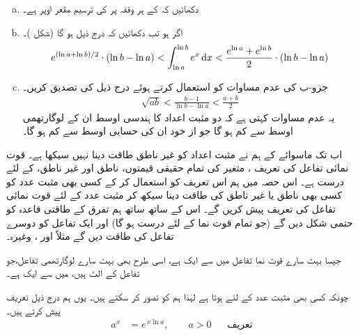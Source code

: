 \begin{enumerate}[a.]
\item
دکھائیں کہ  کے ہر وقفہ پر  کی ترسیم مقعر اوپر ہے۔
\item
اگر  ہو تب دکھائیں کہ درج ذیل ہو گا (شکل )۔
\begin{align*}
e^{(\ln a+\ln b)/2}\cdot(\ln b-\ln a)<\int_{\ln a}^{\ln b} e^x\dif x<\frac{e^{\ln a}+e^{\ln b}}{2}\cdot (\ln b-\ln a)
\end{align*}
\item
جزو-ب کی عدم مساوات کو استعمال کرتے ہوئے  درج ذیل کی تصدیق کریں۔
\begin{align*}
\sqrt{ab}<\frac{b-1}{\ln b-\ln a}<\frac{a+b}{2}
\end{align*}
یہ عدم مساوات کہتی ہے کہ دو مثبت اعداد کا ہندسی اوسط ان کے لوگارتھمی اوسط سے کم ہو گا جو از خود ان کی حسابی اوسط سے کم ہو گا۔
\end{enumerate}

اب تک ماسوائے  کے ہم نے مثبت اعداد کو غیر ناطق طاقت دینا نہیں سیکھا ہے۔ قوت نمائی تفاعل کی تعریف ، متغیر   کی تمام حقیقی قیمتوں، ناطق اور غیر ناطق،  کے لئے درست ہے۔ اس حصہ میں ہم اس تعریف کو استعمال کر کے کسی بھی مثبت عدد کو کسی بھی ناطق یا غیر ناطق کی طاقت دینا سیکھ کر مثبت عدد  کے لئے قوت نمائی تفاعل  کی تعریف پیش کریں گے۔ اس کے ساتھ ساتھ ہم تفرق کے طاقتی قاعدہ کو حتمی شکل دیں گے (جو تمام قوت نما کے لئے درست ہو گا) اور ایک تفاعل کو دوسرے تفاعل کی طاقت دیں گے مثلاً  اور ، وغیرہ۔

جیسا  بہت سارے قوت نما تفاعل میں سے ایک ہے، اسی طرح  بھی بہت سارے لوگارتھمی تفاعل،جو تفاعل  کے الٹ ہیں،  میں سے ایک ہے۔

چونکہ کسی بھی مثبت عدد  کے لئے  ہوتا ہے لہٰذا  ہم  کو  تصور کر سکتے ہیں۔ یوں ہم درج ذیل تعریف پیش کرتے ہیں۔
\begin{align}
a^x&=e^{\,x\ln a},\quad\quad a>0 &&\text{تعریف}
\end{align}

